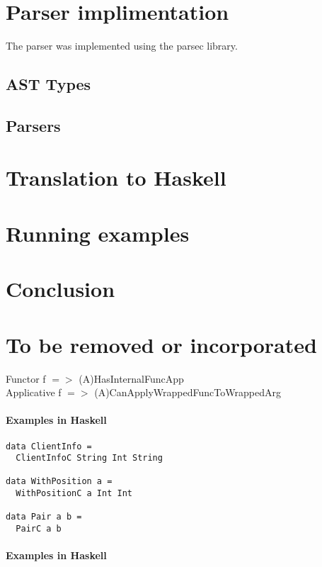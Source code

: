 \documentclass{article}
\def\H{Haskell}
\begin{document}
\section{Parser implimentation}

The parser was implemented using the parsec library.

\subsection{AST Types}

\subsection{Parsers}

\section{Translation to \H}
\section{Running examples}
\section{Conclusion}

\section{To be removed or incorporated}

Functor f $=>$ (A)HasInternalFuncApp\\
Applicative f $=>$ (A)CanApplyWrappedFuncToWrappedArg
\paragraph{Examples in \H}

\begin{verbatim}
data ClientInfo =
  ClientInfoC String Int String

data WithPosition a = 
  WithPositionC a Int Int

data Pair a b = 
  PairC a b
\end{verbatim}

\paragraph{Examples in \H}
\end{document}
